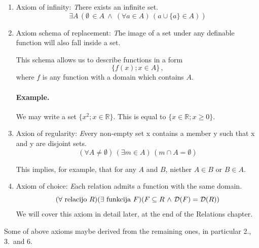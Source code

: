 \documentclass[11pt,paper=b5,footinclude,headinclude]{scrbook} %
\def\inn {{~\wedge~}}
\def\sledi {{~\Rightarrow~}}
\def\cee {{~\Leftrightarrow~}}
\theoremstyle{remark}
\theoremstyle{definition} %
\theoremstyle{theorem} %
\begin{document}
\begin{enumerate}
	This means in particular that for each sets $a$ and $c$ there is a set  $B = a\cap c$, i.e. their intersection.
	
	\medskip
	As a result of this axiom, the set builder notation is always well-defined, i.e. we may define sets as
	$$\{x\in A; P(x)\}\,.$$
	
	\paragraph{Example.} $\{x\in \mathbb{R}; x\ge 0\}$.
	
	\item Axiom of infinity: {\emph There exists an infinite set.}
	$$\exists A\,(\emptyset \,\in A \inn (\forall a\in A)\, (a\cup \{a\}\in A))$$
	

	
	\item Axiom schema of replacement: {\emph The image of a set under any definable function will also fall inside a set.}
	
	This schema allows us to describe functions in a form
	$$\{f(x); x\in A\}\,,$$
	where $f$ is any function with a domain which contains $A$.
	
	\paragraph{Example.} We may write a set $\{x^2; x\in \mathbb{R}\}$. This is equal to $\{x\in \mathbb{R}; x\ge 0\}$.
	
	
	\item Axion of regularity: {\emph Every non-empty set x contains a member y such that x and y are disjoint sets.}
	$$(\forall A\neq \emptyset)\,(\exists m\in A)\,(m\cap A = \emptyset)$$
	
	This implies, for example, that for any $A$ and $B$,  niether $A\in B$ or $B\in A$.


	\item Axiom of choice: {\emph Each relation admits a function with the same domain.}
	$$(\forall \textrm{ relacijo }R)(\exists \textrm{ funkcija }F)(F\subseteq R \inn {\cal D}(F) = {\cal D}(R))$$
	We will cover this axiom in detail later, at the end of the Relations chapter.
\end{enumerate}
\noindent Some of above axioms maybe derived from the remaining ones, in particular 2., 3.~and 6.
\end{document}
